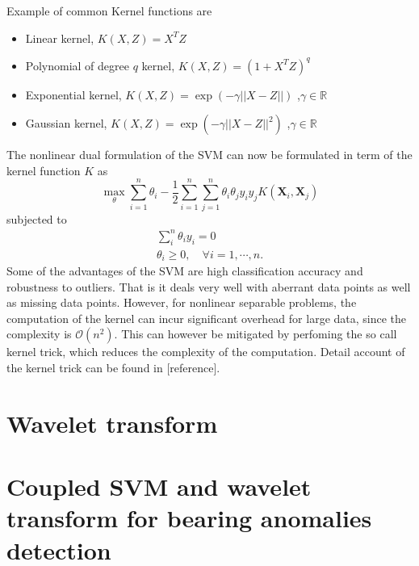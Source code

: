 \documentclass[../Main/thesis.tex]{subfiles}
\begin{document}
\justify
Example of common Kernel functions are 
\begin{itemize}
\item Linear kernel,  $K\left(X,Z\right) = X^{T}Z$
\item Polynomial of degree $q$ kernel, $K\left(X,Z\right) = \left(1+X^{T}Z\right)^{q}$ 
\item Exponential kernel,  $K(X,Z) = \exp\left(-\gamma ||X-Z||\right)$ ,$\gamma\in\mathbb{R}$
\item Gaussian kernel,  $K(X,Z) = \exp\left(-\gamma ||X-Z||^{2}\right)$ ,$\gamma\in\mathbb{R}$
\end{itemize}
The nonlinear dual formulation of the SVM can now be formulated in term of the kernel function $K$ as 
\begin{equation}
\max_{\theta}\sum_{i=1}^{n}\theta_{i} - \frac{1}{2}\sum_{i=1}^{n}\sum_{j=1}^{n}\theta_{i}\theta_{j}y_{i}y_{j}K\left(\bm{X}_{i},\bm{X}_{j}\right)
\end{equation}
subjected to 
\begin{equation}
\begin{split}
\sum_{i}^{n}\theta_{i}y_{i} = 0\\
\theta_{i} \geq 0, \quad \forall i = 1,\cdots,n.
\end{split}
\end{equation}
\justify
Some of the advantages of the SVM are high classification accuracy and robustness to outliers. That is it deals very well with aberrant data points as well as missing data points. However, for nonlinear separable problems, the computation of the kernel can incur significant overhead for large data, since the complexity is $\mathcal{O}\left(n^{2}\right)$. This can however be mitigated by perfoming the so call kernel trick, which reduces the complexity of the computation. Detail account of the kernel trick can be found in [reference].
\section{Wavelet transform}
\label{sec:wavelet}




\section{Coupled SVM and wavelet transform for bearing anomalies detection}
\label{sec:sectionresult}


















\blankpage
\end{document}
